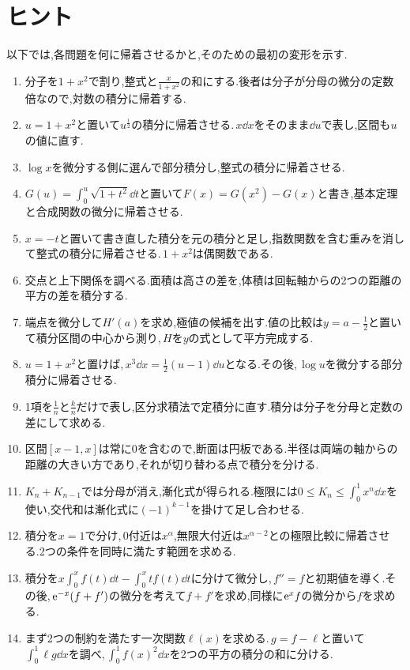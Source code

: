 \section{ヒント}\label{節:総合ヒント}

以下では,各問題を何に帰着させるかと,そのための最初の変形を示す.

\begin{enumerate}[label=\textbf{\thechapter.\arabic*},leftmargin=*]
 \item 分子を$1+x^2$で割り,整式と$\frac{x}{1+x^2}$の和にする.後者は分子が分母の微分の定数倍なので,対数の積分に帰着する.
 \item $u=1+x^2$と置いて$u^{\frac12}$の積分に帰着させる.\,$x\dd x$をそのまま$\dd u$で表し,区間も$u$の値に直す.
 \item $\log x$を微分する側に選んで部分積分し,整式の積分に帰着させる.
 \item $G(u)=\int_0^u\sqrt{1+t^2}\dd t$と置いて$F(x)=G(x^2)-G(x)$と書き,基本定理と合成関数の微分に帰着させる.
 \item $x=-t$と置いて書き直した積分を元の積分と足し,指数関数を含む重みを消して整式の積分に帰着させる.\,$1+x^2$は偶関数である.
 \item 交点と上下関係を調べる.面積は高さの差を,体積は回転軸からの2つの距離の平方の差を積分する.
 \item 端点を微分して$H'(a)$を求め,極値の候補を出す.値の比較は$y=a-\frac12$と置いて積分区間の中心から測り,\,$H$を$y$の式として平方完成する.
 \item $u=1+x^2$と置けば,\,$x^3\dd x=\frac12(u-1)\dd u$となる.その後,\,$\log u$を微分する部分積分に帰着させる.
 \item 1項を$\frac1n$と$\frac{k}{n}$だけで表し,区分求積法で定積分に直す.積分は分子を分母と定数の差にして求める.
 \item 区間$[x-1,x]$は常に$0$を含むので,断面は円板である.半径は両端の軸からの距離の大きい方であり,それが切り替わる点で積分を分ける.
 \item $K_n+K_{n-1}$では分母が消え,漸化式が得られる.極限には$0\le K_n\le\int_0^1x^n\dd x$を使い,交代和は漸化式に$(-1)^{k-1}$を掛けて足し合わせる.
 \item 積分を$x=1$で分け,\,$0$付近は$x^\alpha$,無限大付近は$x^{\alpha-2}$との極限比較に帰着させる.2つの条件を同時に満たす範囲を求める.
 \item 積分を$x\int_0^xf(t)\dd t-\int_0^xtf(t)\dd t$に分けて微分し,\,$f''=f$と初期値を導く.その後,\,$\mathrm{e}^{-x}(f+f')$の微分を考えて$f+f'$を求め,同様に$\mathrm{e}^xf$の微分から$f$を求める.
 \item まず2つの制約を満たす一次関数$\ell(x)$を求める.\,$g=f-\ell$と置いて$\int_0^1\ell g\dd x$を調べ,\,$\int_0^1f(x)^2\dd x$を2つの平方の積分の和に分ける.

\end{enumerate}

